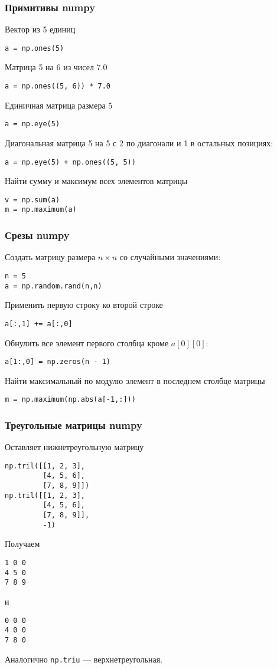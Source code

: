 \documentclass[10pt]{beamer}
\begin{document}
\begin{frame}[fragile]
\frametitle{Примитивы numpy}
Вектор из 5 единиц
\begin{lstlisting}
a = np.ones(5)
\end{lstlisting}

Матрица 5 на 6 из чисел 7.0
\begin{lstlisting}
a = np.ones((5, 6)) * 7.0
\end{lstlisting}


Единичная матрица размера 5
\begin{lstlisting}
a = np.eye(5)
\end{lstlisting}

Диагональная матрица 5 на 5 с 2 по диагонали и 1 в остальных позициях:
\begin{lstlisting}
a = np.eye(5) + np.ones((5, 5))
\end{lstlisting}

Найти сумму и максимум всех элементов матрицы
\begin{lstlisting}
v = np.sum(a)
m = np.maximum(a)
\end{lstlisting}
\end{frame}


\begin{frame}[fragile]
\frametitle{Срезы numpy}
Создать матрицу размера $n \times n$ со случайными значениями:
\begin{lstlisting}
n = 5
a = np.random.rand(n,n)
\end{lstlisting}

Применить первую строку ко второй строке
\begin{lstlisting}
a[:,1] += a[:,0]
\end{lstlisting}

Обнулить все элемент первого столбца кроме $a[0][0]$:
\begin{lstlisting}
a[1:,0] = np.zeros(n - 1)
\end{lstlisting}

Найти максимальный по модулю элемент в последнем столбце матрицы
\begin{lstlisting}
m = np.maximum(np.abs(a[-1,:]))
\end{lstlisting}
\end{frame}

\begin{frame}[fragile]
\frametitle{Треугольные матрицы numpy}
Оставляет нижнетреугольную матрицу
\begin{lstlisting}
np.tril([[1, 2, 3],
         [4, 5, 6],
         [7, 8, 9]])
np.tril([[1, 2, 3],
         [4, 5, 6],
         [7, 8, 9]],
         -1)
\end{lstlisting}

Получаем
\begin{lstlisting}
1 0 0
4 5 0
7 8 9
\end{lstlisting}
и
\begin{lstlisting}
0 0 0
4 0 0
7 8 0
\end{lstlisting}

Аналогично {\tt np.triu} --- верхнетреугольная.
\end{frame}
\end{document}
